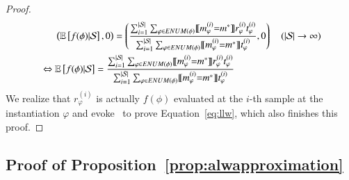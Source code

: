 \begin{proof}
    \begin{align}
         & \phantom{{}\Leftrightarrow{}}  \left( \E \left[  f(\phi) | \mathcal{S} \right],  0 \right)
        =
        \left(
        \frac
        { \sum_{i=1}^{ \lvert \mathcal{S} \rvert} \sum_{\varphi \in ENUM(\phi)}  \ive{m_{\varphi}^{(i)}{=} m^* } r_\varphi^{(i)}  t_\varphi^{(i)} }
        { \sum_{i=1}^{ \lvert \mathcal{S} \rvert}  \sum_{\varphi\in ENUM(\phi)}  \ive{m_{\varphi}^{(i)}{=} m^* }  t_\varphi^{(i)}   }
        , 0
        \right) \quad ( \lvert \mathcal{S} \rvert\rightarrow \infty)                                  \\
         & \Leftrightarrow \E \left[  f(\phi) | \mathcal{S} \right]
        =
        \frac
        { \sum_{i=1}^{ \lvert \mathcal{S} \rvert}  \sum_{\varphi \in ENUM(\phi)}  \ive{m_{\varphi}^{(i)}{=} m^* } r_\varphi^{(i)}  t_\varphi^{(i)} }
        { \sum_{i=1}^{ \lvert \mathcal{S} \rvert}  \sum_{\varphi\in ENUM(\phi)}  \ive{m_{\varphi}^{(i)}{=} m^* }  t_\varphi^{(i)}   } \label{eq:llw}
    \end{align}
    We realize that $r_\varphi^{(i)}$ is actually $f(\phi)$ evaluated at the $i$-th sample at the instantiation $\varphi$ and evoke~\citep[Theorem 4.1]{wu2018discrete} to prove Equation~\ref{eq:llw}, which also finishes this proof.
\end{proof}

\subsection{Proof of Proposition~\ref{prop:alwapproximation}}
\label{app:proof:alwapproximation}


\alwapproximation*


